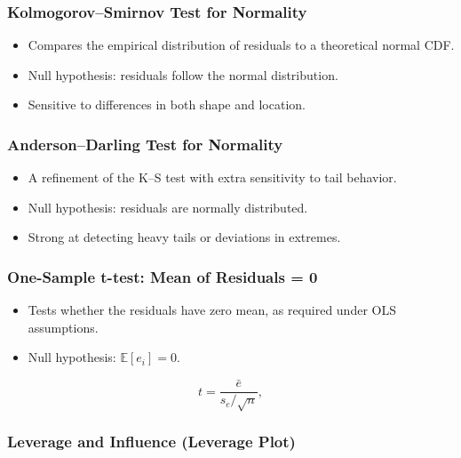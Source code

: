 \documentclass[10pt,a4paper]{article}
\begin{document}
	\subsubsection{Kolmogorov--Smirnov Test for Normality}

	\begin{itemize}
		\item Compares the empirical distribution of residuals to a theoretical normal CDF.
		\item Null hypothesis: residuals follow the normal distribution.
		\item Sensitive to differences in both shape and location.
	\end{itemize}

	\subsubsection{Anderson--Darling Test for Normality}

	\begin{itemize}
		\item A refinement of the K--S test with extra sensitivity to tail behavior.
		\item Null hypothesis: residuals are normally distributed.
		\item Strong at detecting heavy tails or deviations in extremes.
	\end{itemize}

	\subsubsection{One-Sample t-test: Mean of Residuals = 0}

	\begin{itemize}
		\item Tests whether the residuals have zero mean, as required under OLS assumptions.
		\item Null hypothesis: $\mathbb{E}[e_i] = 0$.
	\end{itemize}

	\[
	t = \frac{\bar{e}}{s_e / \sqrt{n}},
	\]

	\subsubsection{Leverage and Influence (Leverage Plot)}
\end{document}
